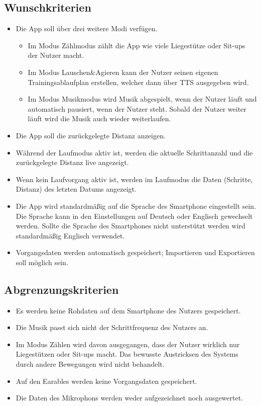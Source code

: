 \documentclass[a4paper,12pt]{article}
\begin{document}
\subsection{Wunschkriterien}
  \begin{itemize}
    \item Die App soll über drei weitere Modi verfügen.
      \begin{itemize}
        \item Im Modus \glqq Zählmodus\grqq{} zählt die App wie viele Liegestütze oder Sit-ups der Nutzer macht.
        \item Im Modus \glqq Lauschen\&Agieren\grqq{} kann der Nutzer seinen eigenen Trainingsablaufplan erstellen, welcher dann über \Gls{TTS} ausgegeben wird.
        \item Im Modus \glqq Musikmodus\grqq{} wird Musik abgespielt, wenn der Nutzer läuft und automatisch pausiert, wenn der Nutzer steht. Sobald der Nutzer weiter läuft wird die Musik auch wieder weiterlaufen.
      \end{itemize}
    \item Die App soll die zurückgelegte Distanz anzeigen.
    \item Während der \glqq Laufmodus\grqq{} aktiv ist, werden die aktuelle Schrittanzahl und die zurückgelegte Distanz live angezeigt.
    \item Wenn kein Laufvorgang aktiv ist, werden im Laufmodus die Daten (Schritte, Distanz) des letzten Datums angezeigt.
    \item Die App wird standardmäßig auf die Sprache des Smartphone eingestellt sein. Die Sprache kann in den Einstellungen auf Deutsch oder Englisch gewechselt werden. Sollte die Sprache des Smartphones nicht unterstützt werden wird standardmäßig Englisch verwendet. 
    \item Vorgangsdaten werden automatisch gespeichert; Importieren und Exportieren soll möglich sein.
  \end{itemize}
  \subsection{Abgrenzungskriterien}
  \begin{itemize}
    \item Es werden keine \Gls{Rohdaten} auf dem Smartphone des Nutzers gespeichert.
    \item Die Musik passt sich nicht der \Gls{Schrittfrequenz} des Nutzers an.
    \item Im Modus \glqq Zählen\grqq{} wird davon ausgegangen, dass der Nutzer wirklich nur Liegestützen oder Sit-ups macht. Das bewusste Austricksen des Systems durch andere Bewegungen wird nicht behandelt.
    \item Auf den \Gls{Earables} werden keine Vorgangsdaten gespeichert.
    \item Die Daten des Mikrophons werden weder aufgezeichnet noch ausgewertet.
  \end{itemize}
\clearpage
\end{document}
